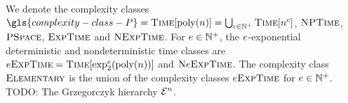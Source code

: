 We denote the complexity classes $\gls{complexity-class-P} =
\cTime{\poly\nn} = \bigcup_{c \in \pNats} \cTime{\nn^c}$,
$\cNP$, $\cPSpace$, $\cExpTime$ and $\cNExpTime$.
For $\expe \in \pNats$, the
$\expe$-exponential deterministic and nondeterministic time classes are
$\ceExpTime\expe = \cTime{\tetr\expe2{\poly\nn}}$ and $\ceNExpTime\expe$.
The complexity class $\cElementary$ is the union of the complexity classes
$\ceExpTime\expe$ for $\expe \in \pNats$.
TODO: The Grzegorczyk hierarchy $\Grz{n}$.